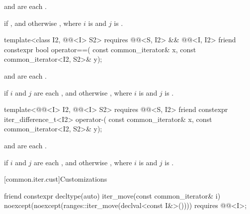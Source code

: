\begin{itemdescr}
\pnum
\hardexpects
{} and 
are each .

\pnum
\returns
{} if ,
and otherwise ,
where $i$ is  and $j$ is .
\end{itemdescr}

%
\begin{itemdecl}
template<class I2, @@<I> S2>
  requires @@<S, I2> && @@<I, I2>
friend constexpr bool operator==(
  const common_iterator& x, const common_iterator<I2, S2>& y);
\end{itemdecl}

\begin{itemdescr}
\pnum
\hardexpects
{} and 
are each .

\pnum
\returns
{} if $i$ and $j$ are each , and otherwise
, where
$i$ is  and $j$ is .
\end{itemdescr}

%
\begin{itemdecl}
template<@@<I> I2, @@<I> S2>
  requires @@<S, I2>
friend constexpr iter_difference_t<I2> operator-(
  const common_iterator& x, const common_iterator<I2, S2>& y);
\end{itemdecl}

\begin{itemdescr}
\pnum
\hardexpects
{} and 
are each .

\pnum
\returns
{} if $i$ and $j$ are each , and otherwise
, where
$i$ is  and $j$ is .
\end{itemdescr}

[common.iter.cust]{Customizations}

%
\begin{itemdecl}
friend constexpr decltype(auto) iter_move(const common_iterator& i)
  noexcept(noexcept(ranges::iter_move(declval<const I&>())))
    requires @@<I>;
\end{itemdecl}

